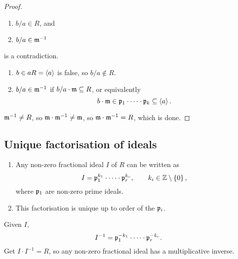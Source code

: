 \begin{proof}
\begin{enumerate}
\item $ b / a \in R $, and
\item $ b / a \in \mathfrak{m}^{-1} $
\end{enumerate}
is a contradiction.
\begin{enumerate}
\item $ b \in aR = \left\langle a \right\rangle $ is false, so $ b / a \notin R $.
\item $ b / a \in \mathfrak{m}^{-1} $ if $ b / a \cdot \mathfrak{m} \subseteq R $, or equivalently
$$ b \cdot \mathfrak{m} \in \mathfrak{p}_1 \cdot \dots \cdot \mathfrak{p}_k \subseteq \left\langle a \right\rangle. $$
\end{enumerate}
$ \mathfrak{m}^{-1} \ne R $, so $ \mathfrak{m} \cdot \mathfrak{m}^{-1} \ne \mathfrak{m} $, so $ \mathfrak{m} \cdot \mathfrak{m}^{-1} = R $, which is done.
\end{proof}

\pagebreak

\subsection{Unique factorisation of ideals}

\begin{theorem}
\label{thm:uniquefactorisationofideals}
\hfill
\begin{enumerate}
\item Any non-zero fractional ideal $ I $ of $ R $ can be written as
$$ I = \pp_1^{k_1} \cdot \dots \cdot \pp_r^{k_r}, \qquad k_i \in \Z \setminus \cbr{0}, $$
where $ \mathfrak{p}_1 $ are non-zero prime ideals.
\item This factorisation is unique up to order of the $ \mathfrak{p}_i $.
\end{enumerate}
\end{theorem}

\begin{remark*}
Given $ I $,
$$ I^{-1} = \mathfrak{p}_1^{-k_1} \cdot \dots \cdot \mathfrak{p}_r^{-k_r}. $$
Get $ I \cdot I^{-1} = R $, so any non-zero fractional ideal has a multiplicative inverse.
\end{remark*}

